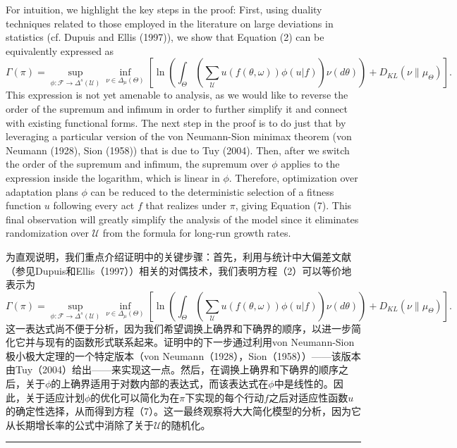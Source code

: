 \documentclass[12pt,a4paper]{article}
\newenvironment{original}
  {\par\noindent\color{black}\smallskip}
  {\par\smallskip}
\newenvironment{translation}
  {\par\noindent\color{blue!70!black}\smallskip}
  {\par\medskip\hrule\medskip}
\begin{document}
\begin{original}
For intuition, we highlight the key steps in the proof: First, using duality techniques related to those employed in the literature on large deviations in statistics (cf. Dupuis and Ellis (1997)), we show that Equation (2) can be equivalently expressed as
\[
\Gamma(\pi) = \sup_{\phi: \mathcal{F} \to \Delta^s(\mathcal{U})} \inf_{\nu \in \Delta_\mu(\Theta)} \left[ \ln\left( \int_\Theta \left( \sum_{\mathcal{U}} u(f(\theta, \omega)) \phi(u|f) \right) \nu(d\theta) \right) + D_{KL}(\nu\|\mu_\Theta) \right].
\]
This expression is not yet amenable to analysis, as we would like to reverse the order of the supremum and infimum in order to further simplify it and connect with existing functional forms. The next step in the proof is to do just that by leveraging a particular version of the von Neumann-Sion minimax theorem (von Neumann (1928), Sion (1958)) that is due to Tuy (2004). Then, after we switch the order of the supremum and infimum, the supremum over $\phi$ applies to the expression inside the logarithm, which is linear in $\phi$. Therefore, optimization over adaptation plans $\phi$ can be reduced to the deterministic selection of a fitness function $u$ following every act $f$ that realizes under $\pi$, giving Equation (7). This final observation will greatly simplify the analysis of the model since it eliminates randomization over $\mathcal{U}$ from the formula for long-run growth rates.
\end{original}
\begin{translation}
为直观说明，我们重点介绍证明中的关键步骤：首先，利用与统计中大偏差文献（参见Dupuis和Ellis（1997））相关的对偶技术，我们表明方程（2）可以等价地表示为
\[
\Gamma(\pi) = \sup_{\phi: \mathcal{F} \to \Delta^s(\mathcal{U})} \inf_{\nu \in \Delta_\mu(\Theta)} \left[ \ln\left( \int_\Theta \left( \sum_{\mathcal{U}} u(f(\theta, \omega)) \phi(u|f) \right) \nu(d\theta) \right) + D_{KL}(\nu\|\mu_\Theta) \right].
\]
这一表达式尚不便于分析，因为我们希望调换上确界和下确界的顺序，以进一步简化它并与现有的函数形式联系起来。证明中的下一步通过利用von Neumann-Sion极小极大定理的一个特定版本（von Neumann（1928），Sion（1958））——该版本由Tuy（2004）给出——来实现这一点。然后，在调换上确界和下确界的顺序之后，关于$\phi$的上确界适用于对数内部的表达式，而该表达式在$\phi$中是线性的。因此，关于适应计划$\phi$的优化可以简化为在$\pi$下实现的每个行动$f$之后对适应性函数$u$的确定性选择，从而得到方程（7）。这一最终观察将大大简化模型的分析，因为它从长期增长率的公式中消除了关于$\mathcal{U}$的随机化。
\end{translation}
\end{document}
